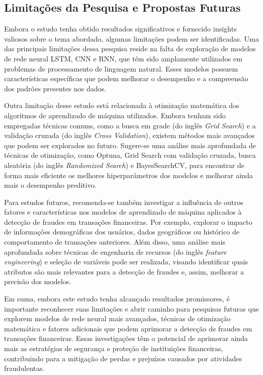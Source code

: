 \subsection{Limita\c c\~oes da Pesquisa e Propostas Futuras}



Embora o estudo tenha obtido resultados significativos e fornecido insights valiosos sobre o tema abordado, algumas limitações podem ser identificadas. Uma das principais limitações dessa pesquisa reside na falta de exploração de modelos de rede neural LSTM, CNN e RNN, que têm sido amplamente utilizados em problemas de processamento de linguagem natural. Esses modelos possuem características específicas que podem melhorar o desempenho e a compreensão dos padrões presentes nos dados.

Outra limitação desse estudo está relacionada à otimização matemática dos algoritmos de aprendizado de máquina utilizados. Embora tenham sido empregadas técnicas comuns, como a busca em grade (do inglês \textit{Grid Search}) e a validação cruzada (do inglês \textit{Cross Validation}), existem métodos mais avançados que podem ser explorados no futuro. Sugere-se uma análise mais aprofundada de técnicas de otimização, como Optuna, Grid Search com validação cruzada, busca aleatória (do inglês \textit{Randomized Search}) e BayesSearchCV, para encontrar de forma mais eficiente os melhores hiperparâmetros dos modelos e melhorar ainda mais o desempenho preditivo.

Para estudos futuros, recomenda-se também investigar a influência de outros fatores e características nos modelos de aprendizado de máquina aplicados à detecção de fraudes em transações financeiras. Por exemplo, explorar o impacto de informações demográficas dos usuários, dados geográficos ou histórico de comportamento de transações anteriores. Além disso, uma análise mais aprofundada sobre técnicas de engenharia de recursos (do inglês \textit{feature engineering}) e seleção de variáveis pode ser realizada, visando identificar quais atributos são mais relevantes para a detecção de fraudes e, assim, melhorar a precisão dos modelos.

Em suma, embora este estudo tenha alcançado resultados promissores, é importante reconhecer suas limitações e abrir caminho para pesquisas futuras que explorem modelos de rede neural mais avançados, técnicas de otimização matemática e fatores adicionais que podem aprimorar a detecção de fraudes em transações financeiras. Essas investigações têm o potencial de aprimorar ainda mais as estratégias de segurança e proteção de instituições financeiras, contribuindo para a mitigação de perdas e prejuízos causados por atividades fraudulentas.